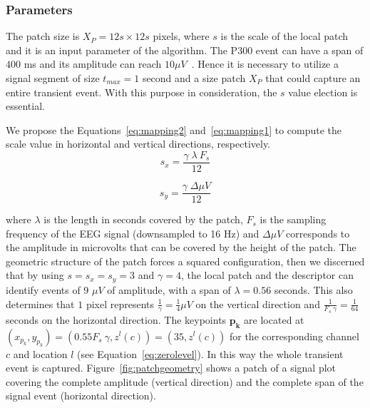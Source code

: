 \documentclass[utf8]{frontiersSCNS} %
\begin{document}


\subsubsection{Parameters}

The patch size is $X_P = 12s \times 12s$ pixels, where $s$ is the scale of the local patch and it is an input parameter of the algorithm. The P300 event can have a span of $400$ ms and its amplitude can reach $ 10 \mu V $~\citep{Rao2013}.  Hence it is necessary to utilize a signal segment of size $t_{max} = 1$ second and a size patch $X_P$ that could capture an entire transient event. With this purpose in consideration, the $s$ value election is essential.

We propose the Equations~\ref{eq:mapping2} and~\ref{eq:mapping1} to compute the scale value in horizontal and vertical directions, respectively. 
\begin{equation}
s_x = \frac{ \gamma \;  \lambda \  F_s}{12}
\label{eq:mapping2}
\end{equation}

\begin{equation}
s_y= \frac{\gamma \; \Delta \mu V}{12} 
\label{eq:mapping1}
\end{equation}

\noindent where $ \lambda $ is the length in seconds covered by the patch, $ F_s $ is the sampling frequency of the EEG signal (downsampled to 16 Hz) and  $\Delta  \mu V $ corresponds to the amplitude in microvolts that can be covered by the height of the patch. The geometric structure of the patch forces a squared configuration, then we discerned that by using $ s =s_x =s_y = 3 $ and $ \gamma = 4 $,  the local patch and the descriptor can identify events of 9 $ \mu V $ of amplitude, with a span of $ \lambda = 0.56$ seconds.  This also determines that $ 1 $ pixel represents $ \frac{1}{\gamma}= \frac{1}{4} \mu V $ on the vertical direction and $\frac{1}{F_s \ \gamma}=\frac{1}{64}$ seconds on the horizontal direction. The keypoints  $\mathbf{p_k}$  are located at $ (x_{p_k}, y_{p_k} )= ( 0.55 F_s \ \gamma, z^l(c) )= (35,  z^l(c)) $ for the corresponding channel $c$ and location $l$ (see Equation~\ref{eq:zerolevel}).   In this way the whole transient event is captured. 
Figure~\ref{fig:patchgeometry} shows a patch of a signal plot covering the complete amplitude (vertical direction) and the complete span of the signal event (horizontal direction). 
\end{document}
